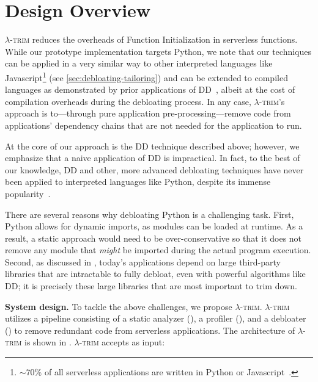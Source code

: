 \documentclass[sigplan,screen]{acmart}
\newcommand{\sys}{\textsc{\ensuremath{\lambda}-trim}\xspace}
\newcommand{\heading}[1]{\vspace{4pt}\noindent\textbf{#1.}}
\begin{document}
  
\section{Design Overview}\label{sec:design}









\sys reduces the overheads of Function Initialization in serverless functions.
While our prototype implementation targets Python, we note that our techniques can be applied in a very similar way to other interpreted languages like Javascript\footnote{$\sim$70\% of all serverless applications are written in Python or Javascript~\cite{datadog-blog}.} (see \cref{sec:debloating-tailoring}) and can be extended to compiled languages as demonstrated by prior applications of DD~\cite{delta2002,deltarl2018}, albeit at the cost of compilation overheads during the debloating process.
In any case, \sys's approach is to---through pure application pre-processing---remove code from applications' dependency chains that are not needed for the application to run.

At the core of our approach is the DD technique described above; however, we emphasize that a naive application of DD is impractical.
In fact, to the best of our knowledge, DD and other, more advanced debloating techniques have never been applied to interpreted languages like Python, despite its immense popularity~\cite{pybloat2024}.



There are several reasons why debloating Python is a challenging task.
First, Python allows for dynamic imports, as modules can be loaded at runtime.
As a result, a static approach would need to be over-conservative so that it does not remove any module that \textit{might} be imported during the actual program execution.
Second, as discussed in , today's applications depend on large third-party libraries that are intractable to fully debloat, even with powerful algorithms like DD;
it is precisely these large libraries that are most important to trim down.

\heading{System design}
To tackle the above challenges, we propose \sys.
\sys utilizes a pipeline consisting of a static analyzer (), a profiler (), and a debloater () to remove redundant code from serverless applications.
The architecture of \sys is shown in .
\sys accepts as input:
\end{document}
